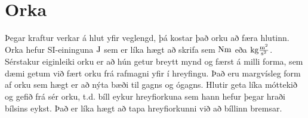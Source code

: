 \chapter{Orka}
Þegar kraftur verkar á hlut yfir veglengd, þá kostar það orku að færa hlutinn.
Orka hefur SI-eininguna $\textrm{J}$ sem er líka hægt að skrifa sem $\textrm{Nm}$
eða $\textrm{kg} \frac{\text{m}^2}{\text{s}^2}$. Sérstakur eiginleiki orku er að hún getur breytt mynd
og færst á milli forma, sem dæmi getum við fært orku frá rafmagni yfir í
hreyfingu. Það eru margvísleg form af orku sem hægt er að nýta bæði til gagns
og ógagns. Hlutir geta líka móttekið og gefið frá sér orku, t.d. bíll eykur
hreyfiorkuna sem hann hefur þegar hraði bílsins eykst. Það er líka hægt að tapa
hreyfiorkunni við að bíllinn bremsar.
